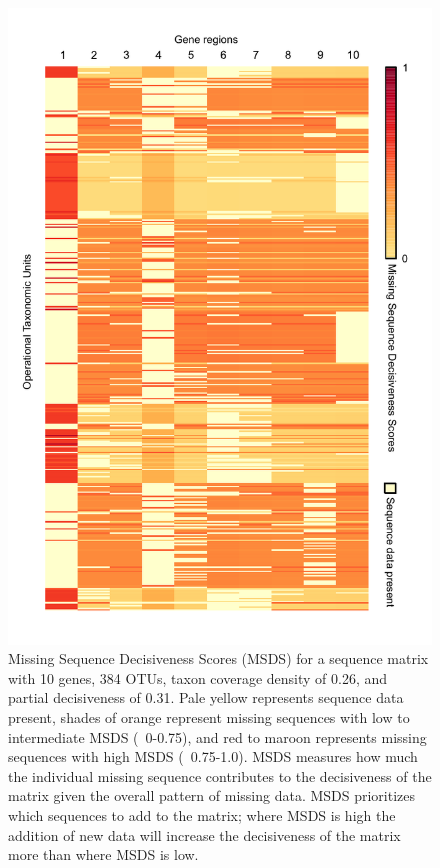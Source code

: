 \documentclass[10pt]{report}
\begin{document}
\begin{figure}[!tpb]
\centerline{\includegraphics[scale=1.0]{figures/MSDS_figure_1.pdf}}
\caption{Missing Sequence Decisiveness Scores (MSDS) for a sequence matrix with 10 genes, 384 OTUs, taxon coverage density of 0.26, and partial decisiveness of 0.31.
Pale yellow represents sequence data present, shades of orange represent missing sequences with low to intermediate MSDS (~0-0.75),
and red to maroon represents missing sequences with high MSDS (~0.75-1.0).
MSDS measures how much the individual missing sequence contributes to the decisiveness of the matrix given the overall pattern of missing data.
MSDS prioritizes which sequences to add to the matrix; where MSDS is high the addition of new data will increase the
decisiveness of the matrix more than where MSDS is low.}\label{fig:02}
\end{figure}


%
\cleardoublepage
{}
{}

\end{document}
